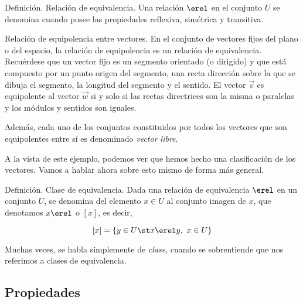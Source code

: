 



\iffalse
Las relaciones de equivalencia en un conjunto sirven fundamentalmente para
obtener clasificaciones de los elementos del conjunto. Estas clasificaciones
se hacen mediante las clases de cquivalencia. La idcntifieación de todos los
conjuntos de una clase de equivalencia conduce al concepto de conjunto
cociente. Este concepto es de gran utilidad para definir nuevos conjuntos
partiendo de uno determinado, como haremos en los ejemplos TKTK y TKTK.
\fi

Definición. Relación de equivalencia. Una relación $\erel$ en el conjunto
$U$ se denomina  cuando posee las
propiedades reflexiva, simétrica y transitiva.

\begin{example}
  Relación de equipolencia entre vectores. En el conjunto de vectores fijos
  del plano o del espacio, la relación de equipolencia es un relación de
  equivalencia. Recuérdese que un vector fijo es un segmento orientado (o
  dirigido) y que está compuesto por un punto origen del segmento, una recta
  dirección sobre la que se dibuja el segmento, la longitud del segmento y
  el sentido. El vector $\vec{v}$ es equipolente al vector $\vec{w}$ si y
  solo si las rectas directrices son la misma o paralelas y los módulos y
  sentidos son iguales.

  Además, cada uno de los conjuntos constituidos por todos los vectores que
  son equipolentes entre sí es denominado \emph{vector libre}.

  A la vista de este ejemplo, podemos ver que hemos hecho una clasificación
  de los vectores. Vamos a hablar ahora sobre esto mismo de forma más
  general.
\end{example}

Definición. Clase de equivalencia. Dada una relación de equivalencia $\erel$
en un conjunto $U$, se denomina  del elemento
$x \in U$ al conjunto imagen de $x$, que denotamos $x\erel$ o $[x]$, es
decir,

\[ [x] = \{y \in U \st x \erel y, \ x \in U\} \]

Muchas veces, se habla simplemente de \emph{clase}, cuando se sobrentiende
que nos referimos a clases de equivalencia.




\subsection{Propiedades}

